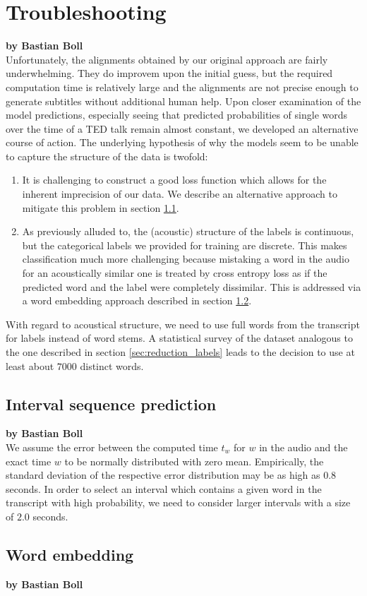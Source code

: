 \chapter{Troubleshooting}

\textbf{by Bastian Boll} \\

Unfortunately, the alignments obtained by our original approach are fairly underwhelming. They do improvem upon the initial guess, but the required computation time is relatively large and the alignments are not precise enough to generate subtitles without additional human help. Upon closer examination of the model predictions, especially seeing that predicted probabilities of single words over the time of a TED talk remain almost constant, we developed an alternative course of action. The underlying hypothesis of why the models seem to be unable to capture the structure of the data is twofold:
\begin{enumerate}
	\item It is challenging to construct a good loss function which allows for the inherent imprecision of our data. We describe an alternative approach to mitigate this problem in section \ref{seq:interval_seq}.
	\item As previously alluded to, the (acoustic) structure of the labels is continuous, but the categorical labels we provided for training are discrete. This makes classification much more challenging because mistaking a word in the audio for an acoustically similar one is treated by cross entropy loss as if the predicted word and the label were completely dissimilar. This is addressed via a word embedding approach described in section \ref{seq:word_embedding}.
\end{enumerate}
With regard to acoustical structure, we need to use full words from the transcript for labels instead of word stems. A statistical survey of the dataset analogous to the one described in section \ref{sec:reduction_labels} leads to the decision to use at least about $7000$ distinct words.

\section{Interval sequence prediction}
\label{seq:interval_seq}

\textbf{by Bastian Boll} \\
We assume the error between the computed time $t_w$ for $w$ in the audio and the exact time $w$ to be normally distributed with zero mean. Empirically, the standard deviation of the respective error distribution may be as high as $0.8$ seconds. In order to select an interval which contains a given word in the transcript with high probability, we need to consider larger intervals with a size of $2.0$ seconds.\\



\section{Word embedding}
\label{seq:word_embedding}

\textbf{by Bastian Boll} \\

